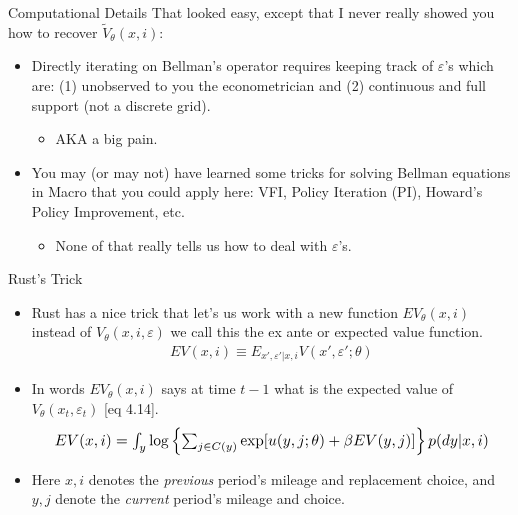 \documentclass[xcolor=pdftex,dvipsnames,table,mathserif,aspectratio=169]{beamer}
\begin{document}
\begin{frame}{Computational Details}
That looked easy, except that I never really showed you how to recover $\tilde{V}_{\theta}(x,i)$:
\begin{itemize}
\item Directly iterating on Bellman's operator requires keeping track of $\varepsilon$'s which are: (1) unobserved to you the econometrician and (2) continuous and full support (not a discrete grid).
\begin{itemize}
\item AKA a big pain.
\end{itemize}
\item You may (or may not) have learned some tricks for solving Bellman equations in Macro that you could apply here: VFI, Policy Iteration (PI), Howard's Policy Improvement, etc.
\begin{itemize}
\item None of that really tells us how to deal with $\varepsilon$'s.
\end{itemize}
\end{itemize}
\end{frame}

\begin{frame}{Rust's Trick}\

\begin{itemize}
\item Rust has a nice trick that let's us work with a new function $EV_{\theta}(x,i)$ instead of $V_{\theta}(x,i,\varepsilon)$ we call this the \alert{ex ante} or \alert{expected value function}.
\begin{eqnarray*}
EV(x, i) \equiv E_{x', \varepsilon ' | x, i} V(x', \varepsilon ' ; \theta)
\end{eqnarray*}
\item In words $EV_{\theta}(x,i)$ says at time $t-1$ what is the expected value of $V_{\theta}(x_t,\varepsilon_t)$ [eq 4.14].
\begin{eqnarray*}
\resizebox{.9\hsize}{!}{$EV(x,i) = \int_y \log \left \{ \sum_{j \in C(y)} \exp [ u(y,j; \theta) + \beta EV(y, j)] \right \} p(dy|x,i) $}
\end{eqnarray*}
\item Here $x, i$ denotes the \emph{previous} period's mileage and replacement choice, and $y, j$ denote the \emph{current} period's mileage and choice. 
\end{itemize}
\end{frame}
\end{document}

